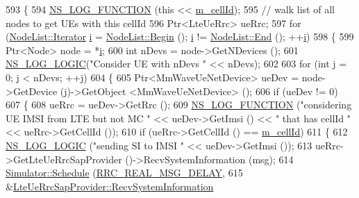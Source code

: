 \begin{DoxyCode}
593 \{
594   \hyperlink{log-macros-disabled_8h_a90b90d5bad1f39cb1b64923ea94c0761}{NS\_LOG\_FUNCTION} (\textcolor{keyword}{this} << \hyperlink{classns3_1_1MmWaveLteEnbRrcProtocolReal_af21fba3734d1818dc9166e6ab8817b66}{m\_cellId});
595   \textcolor{comment}{// walk list of all nodes to get UEs with this cellId}
596   Ptr<LteUeRrc> ueRrc;
597   \textcolor{keywordflow}{for} (\hyperlink{classns3_1_1NodeList_a9e2679a94efb4f0066cc21e65440364d}{NodeList::Iterator} \hyperlink{bernuolliDistribution_8m_a6f6ccfcf58b31cb6412107d9d5281426}{i} = \hyperlink{classns3_1_1NodeList_a93d2211831f5cb71d1dbb721e2721d7f}{NodeList::Begin} (); 
      \hyperlink{bernuolliDistribution_8m_a6f6ccfcf58b31cb6412107d9d5281426}{i} != \hyperlink{classns3_1_1NodeList_a027a558c16e6078e25c7ffc67becb559}{NodeList::End} (); ++\hyperlink{bernuolliDistribution_8m_a6f6ccfcf58b31cb6412107d9d5281426}{i})
598     \{
599       Ptr<Node> node = *\hyperlink{bernuolliDistribution_8m_a6f6ccfcf58b31cb6412107d9d5281426}{i};
600       \textcolor{keywordtype}{int} nDevs = node->GetNDevices ();
601       \hyperlink{group__logging_ga88acd260151caf2db9c0fc84997f45ce}{NS\_LOG\_LOGIC}(\textcolor{stringliteral}{"Consider UE with nDevs "} << nDevs);
602 
603       \textcolor{keywordflow}{for} (\textcolor{keywordtype}{int} j = 0; j < nDevs; ++j)
604         \{
605           Ptr<MmWaveUeNetDevice> ueDev = node->GetDevice (j)->GetObject <MmWaveUeNetDevice> ();
606           \textcolor{keywordflow}{if} (ueDev != 0)
607           \{
608             ueRrc = ueDev->GetRrc ();              
609             \hyperlink{log-macros-disabled_8h_a90b90d5bad1f39cb1b64923ea94c0761}{NS\_LOG\_FUNCTION} (\textcolor{stringliteral}{"considering UE IMSI from LTE but not MC "} << ueDev->GetImsi ()
       << \textcolor{stringliteral}{" that has cellId "} << ueRrc->GetCellId ());
610             \textcolor{keywordflow}{if} (ueRrc->GetCellId () == \hyperlink{classns3_1_1MmWaveLteEnbRrcProtocolReal_af21fba3734d1818dc9166e6ab8817b66}{m\_cellId})
611             \{       
612               \hyperlink{group__logging_ga88acd260151caf2db9c0fc84997f45ce}{NS\_LOG\_LOGIC} (\textcolor{stringliteral}{"sending SI to IMSI "} << ueDev->GetImsi ());
613               ueRrc->GetLteUeRrcSapProvider ()->RecvSystemInformation (msg);
614               \hyperlink{classns3_1_1Simulator_a671882c894a08af4a5e91181bf1eec13}{Simulator::Schedule} (\hyperlink{namespacens3_a8e3f859197e39602ba3ea59033f00404}{RRC\_REAL\_MSG\_DELAY}, 
615                                    &\hyperlink{classns3_1_1LteUeRrcSapProvider_a34d16c5adabf7ee0caf111fd2b6bfbd3}{LteUeRrcSapProvider::RecvSystemInformation}

\end{DoxyCode}
